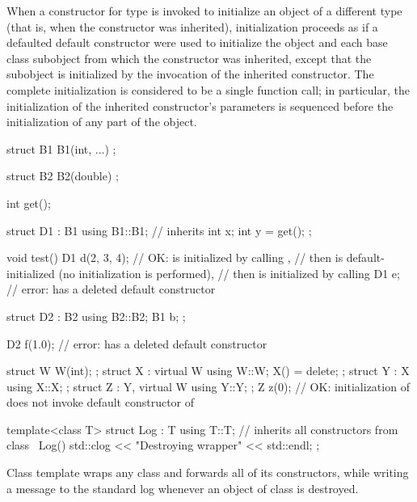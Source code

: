 \pnum
When a constructor for type  is invoked
to initialize an object of a different type 
(that is, when the constructor was inherited),
initialization proceeds as if a defaulted default constructor
were used to initialize the  object and
each base class subobject from which the constructor was inherited,
except that the  subobject is initialized
by the invocation of the inherited constructor.
The complete initialization is considered to be a single function call;
in particular, the initialization of the inherited constructor's parameters
is sequenced before the initialization of any part of the  object.
\begin{example}
\begin{codeblock}
struct B1 {
  B1(int, ...) { }
};

struct B2 {
  B2(double) { }
};

int get();

struct D1 : B1 {
  using B1::B1;     // inherits 
  int x;
  int y = get();
};

void test() {
  D1 d(2, 3, 4);    // OK:  is initialized by calling ,
                    // then  is default-initialized (no initialization is performed),
                    // then  is initialized by calling 
  D1 e;             // error:  has a deleted default constructor
}

struct D2 : B2 {
  using B2::B2;
  B1 b;
};

D2 f(1.0);          // error:  has a deleted default constructor

struct W { W(int); };
struct X : virtual W { using W::W; X() = delete; };
struct Y : X { using X::X; };
struct Z : Y, virtual W { using Y::Y; };
Z z(0);             // OK: initialization of  does not invoke default constructor of 

template<class T> struct Log : T {
  using T::T;       // inherits all constructors from class 
  ~Log() { std::clog << "Destroying wrapper" << std::endl; }
};
\end{codeblock}
Class template  wraps any class and forwards all of its constructors,
while writing a message to the standard log
whenever an object of class  is destroyed.
\end{example}

